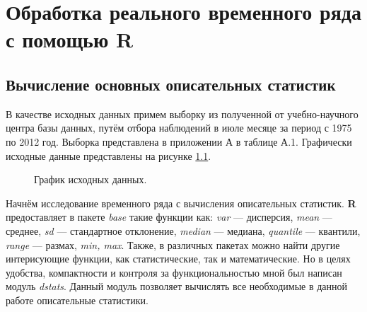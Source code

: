 \newpage

\chapter{Обработка реального временного ряда с помощью R}

\section{Вычисление основных описательных статистик} %
\label{sec:dstats}

В качестве исходных данных примем выборку из полученной от учебно-научного центра базы данных, путём отбора наблюдений в июле месяце за период с 1975 по 2012 год. Выборка представлена в приложении А в таблице А.1. Графически исходные данные представлены на рисунке \ref{img:input}.

\begin{figure}[ht]
\caption{График исходных данных.}
\label{img:input}
\end{figure}

Начнём исследование временного ряда с вычисления описательных статистик. \textbf{R} предоставляет в пакете \textit{base} такие функции как: \textit{var} --- дисперсия, \textit{mean} --- среднее, \textit{sd} --- стандартное отклонение, \textit{median} --- медиана, \textit{quantile} --- квантили, \textit{range} --- размах, \textit{min, max}. Также, в различных пакетах можно найти другие интерисующие функции, как статистические, так и математические. Но в целях удобства, компактности и контроля за функциональностью мной был написан модуль \textit{dstats}. Данный модуль позволяет вычислять все необходимые в данной работе описательные статистики. 

